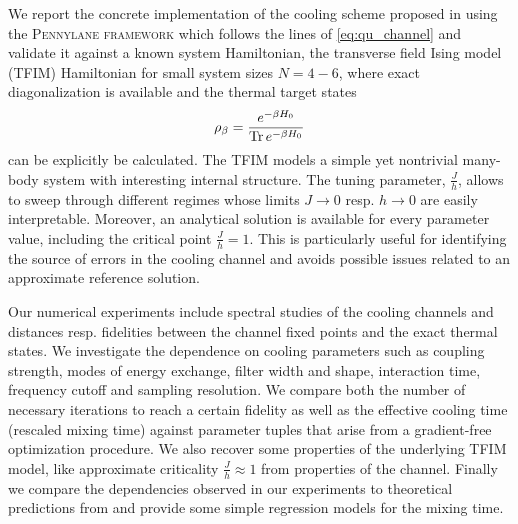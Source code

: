 \documentclass[12pt,a4paper]{article}
\newcommand{\SA}[1]{{\color{orange}{[SA: #1]}}}
\begin{document}
We report the concrete implementation of the cooling scheme proposed in \citet{ding2025} using the \textsc{Pennylane framework} which follows the lines of \cref{eq:qu_channel} and validate it against a known system Hamiltonian, the transverse field Ising model (TFIM) Hamiltonian for small system sizes $N=4-6$, where exact diagonalization is available  and the thermal target states 
\begin{align}\label{eq:gibbs_state}
\rho_{\beta}= \frac{e^{-\beta H_0}}{{\rm Tr}\, e^{-\beta H_0}}
\end{align}
can be %
explicitly be calculated. The TFIM models a simple yet nontrivial many-body system with interesting internal structure. The %
tuning parameter, $\frac{J}{h}$, %
allows to sweep %
through different regimes whose limits $J\to 0$ resp. $h\to 0$ are easily interpretable. Moreover, an analytical solution is available for every parameter value, including the critical point $\frac{J}{h}=1$. This is particularly useful for identifying the source of errors in the cooling channel and avoids possible issues related to  %
an approximate reference solution. 


Our numerical experiments include spectral studies of the cooling channels and distances resp. fidelities between the channel fixed points and the exact thermal states. We investigate the dependence on cooling parameters such as coupling strength, modes of energy exchange, filter width and shape, interaction time, frequency cutoff and sampling resolution. We compare both the number of necessary iterations to reach a certain fidelity as well as the effective cooling time (rescaled mixing time) against parameter tuples that arise from a gradient-free optimization procedure. We also recover some properties of the underlying TFIM model, like approximate criticality $\frac{J}{h} \approx 1$ from properties of the channel.
Finally we compare the dependencies observed in our experiments to theoretical predictions from \citet{ding2025} and provide some simple regression models for the mixing time. %
\end{document}
